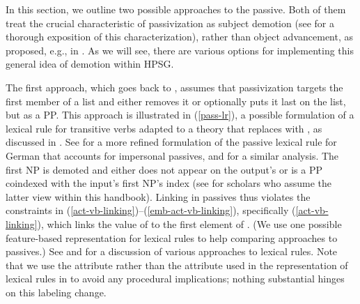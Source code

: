 \documentclass[output=paper
	        ,collection
	        ,collectionchapter
 	        ,biblatex
                ,babelshorthands
                ,newtxmath
                ,draftmode
                ,colorlinks, citecolor=brown
]{langscibook}
\begin{document}
In this section, we outline two possible approaches to 
the passive.  
Both of them treat the crucial characteristic of passivization as subject demotion (see \citealt{Blevins2003} for a thorough exposition of this characterization), rather than object advancement, as proposed, e.g., in  \citep{PerlmutterandPostal1983b}.
As we will see, there are various options for implementing this general idea of demotion within HPSG.

The first approach, which goes back to \citet{pollard+sag:1987}, assumes that passivization targets the first member of a  list and either removes it or optionally puts it last on the list, but as a PP.
This approach is illustrated in (\ref{pass-lr}), a possible formulation of a lexical rule for transitive verbs adapted to a theory that replaces  with \argst, as discussed in \citet[67]{Manning+Sag:1999}. 
See  for a  more refined formulation of the passive lexical rule for German that accounts for impersonal passives, and \citet{Blevins2003} for a similar analysis.
The first NP is demoted and either does not appear on the output's \argst or is a PP coindexed with the input's first NP's index (see  
for scholars who assume the latter view within this handbook).
Linking in passives thus violates the constraints in (\ref{act-vb-linking})--(\ref{emb-act-vb-linking}), specifically (\ref{act-vb-linking}), which links the value of  to the first element of \argst. (We use one possible feature-based representation for lexical rules to help comparing approaches to passives.) See \citet{Meurers2001} and  for a discussion of various approaches to lexical rules.
Note that we use the attribute  rather than the  attribute used in the representation of lexical rules in \citet[76]{Meurers2001} to avoid any procedural implications; nothing substantial hinges on this labeling change.
\end{document}

